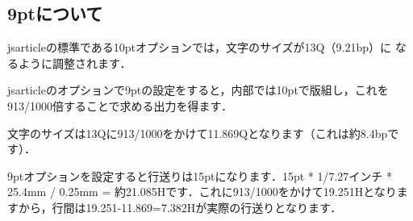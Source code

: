 \documentclass[a4j, twocolumn, twoside, draft]{jsarticle}
\begin{document}
\subsection{9ptについて}
jsarticleの標準である10ptオプションでは，文字のサイズが13Q（9.21bp）に
なるように調整されます．

jsarticleのオプションで9ptの設定をすると，内部では10ptで版組し，これを
913/1000倍することで求める出力を得ます．

文字のサイズは13Qに913/1000をかけて11.869Qとなります（これは約8.4bpです）．

9ptオプションを設定すると行送りは15ptになります．15pt * 1/7.27インチ *
25.4mm / 0.25mm = 約21.085Hです．これに913/1000をかけて19.251Hとなりま
すから，行間は19.251-11.869=7.382Hが実際の行送りとなります．


\end{document}
